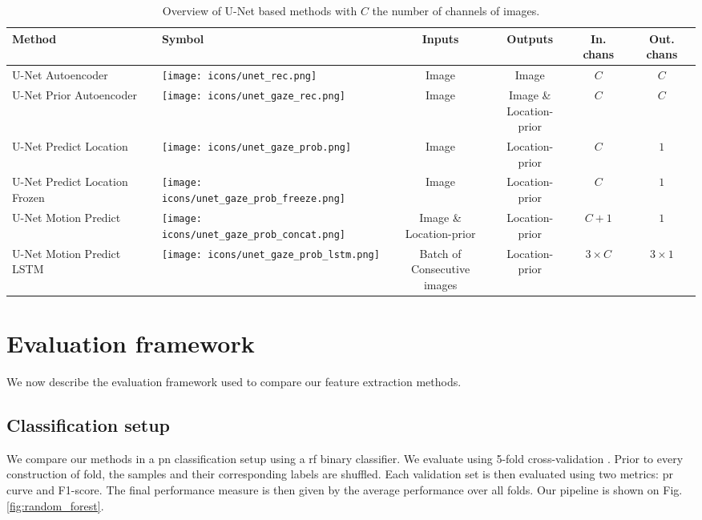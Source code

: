 \begin{table}[!htbp]
   \centering
   \caption[U-Net based method overview]{Overview of U-Net based methods with $C$ the number of channels of images.}
   \begin{tabular}{l|m{1.3cm}|c|c|c|c}
      \toprule
      \textbf{Method} & \textbf{Symbol} & \textbf{Inputs} & \textbf{Outputs} & \textbf{In. chans} & \textbf{Out. chans} \\
      \midrule
      U-Net Autoencoder & \texttt{[image: icons/unet\_rec.png]} & Image & Image & $C$ & $C$ \\
      \midrule
      U-Net Prior Autoencoder & \texttt{[image: icons/unet\_gaze\_rec.png]} & Image & \specialcell{Image \& \\Location-prior} & $C$ & $C$ \\
      \midrule
      U-Net Predict Location & \texttt{[image: icons/unet\_gaze\_prob.png]} & Image & Location-prior & $C$ & $1$ \\
      \midrule
      U-Net Predict Location Frozen & \texttt{[image: icons/unet\_gaze\_prob\_freeze.png]} & Image & Location-prior & $C$ & $1$ \\
      \midrule
      U-Net Motion Predict & \texttt{[image: icons/unet\_gaze\_prob\_concat.png]} & \specialcell{Image \& \\Location-prior} & Location-prior & $C+1$ & $1$ \\
       \midrule
      U-Net Motion Predict LSTM & \texttt{[image: icons/unet\_gaze\_prob\_lstm.png]} & \specialcell{Batch of \\ Consecutive images} & Location-prior & $3 \times C$ & $3 \times 1$ \\
      \bottomrule
   \end{tabular}
   \label{tab:summary_unet_methods}
\end{table}


\section{Evaluation framework}
We now describe the evaluation framework used to compare our feature extraction methods.

\subsection{Classification setup} \label{random_forest}
We compare our methods in a \gls{pn} classification setup using a \gls{rf} binary classifier.
We evaluate using 5-fold cross-validation \cite[p. 241]{hastie09}.
Prior to every construction of fold, the samples and their corresponding labels are shuffled.
Each validation set is then evaluated using two metrics: \gls{pr} curve and F1-score.
The final performance measure is then given by the average performance over all folds.
Our pipeline is shown on Fig. \ref{fig:random_forest}.

